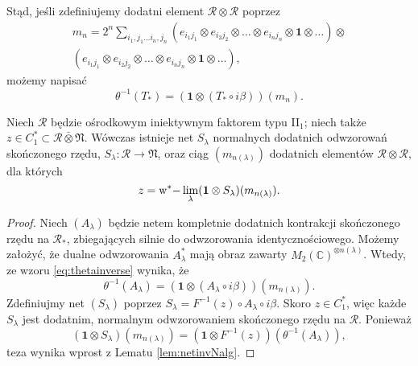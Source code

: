 Stąd, jeśli zdefiniujemy dodatni element $\mathcal{R}\otimes\mathcal{R}$ poprzez
\begin{eqnarray}
m_{n} = 2^{n} \sum \limits_{i_{1}, j_{1}\ldots i_{n}, j_{n}}
\left( e_{i_{1} j_{1}} \otimes e_{i_{2} j_{2}} \otimes \ldots \otimes
e_{i_{n} j_{n}} \otimes \mathbf{1} \otimes \ldots \right) \otimes \nonumber\\
\left( e_{i_{1} j_{1}} \otimes e_{i_{2} j_{2}}\otimes \ldots \otimes
e_{i_{n} j_{n}} \otimes \mathbf{1} \otimes \ldots\right),
\end{eqnarray}
możemy napisać
\begin{equation}
\label{eq:thetainverse}
\theta^{-1}(T_{*}) =(\mathbf{1} \otimes (T_{*} \circ i \beta)) (m_{n}).
\end{equation}

\begin{Lemma}
\label{lem:netininjectivefactor}
Niech $\mathcal{R}$
będzie ośrodkowym iniektywnym faktorem typu II$\phantom{}_{1}$;
niech także $z \in C_{1}^{*} \subset \mathcal{R} \bar{\otimes} \mathfrak{N}$.
Wówczas istnieje net $S_{\lambda}$ normalnych dodatnich odwzorowań skończonego rzędu,
$S_{\lambda}: \mathcal{R} \rightarrow \mathfrak{N}$,
oraz ciąg $(m_{n(\lambda)})$ dodatnich elementów $\mathcal{R} \otimes \mathcal{R}$,
dla których
\begin{equation}
z = {\rm w^*-} \lim \limits_{\lambda}(\mathbf{1} \otimes S_{\lambda})(m_{n(\lambda)}).
\end{equation}
\end{Lemma}
\begin{proof}
Niech $(A_{\lambda})$ będzie netem kompletnie dodatnich kontrakcji
skończonego rzędu na $\mathcal{R}_{*}$,
zbiegających silnie do odwzorowania identycznościowego.
Możemy założyć, że dualne odwzorowania $A_{\lambda}^{*}$
mają obraz zawarty $M_{2}(\mathbb{C})^{\otimes n(\lambda)}$.
Wtedy, ze wzoru \eqref{eq:thetainverse} wynika, że
\begin{equation}
\theta^{-1} (A_{\lambda}) =
( \mathbf{1} \otimes (A_{\lambda} \circ i\beta)) (m_{n(\lambda)}).
\end{equation}
Zdefiniujmy net $(S_{\lambda})$ poprzez
$S_{\lambda} = F^{-1}(z) \circ A_{\lambda} \circ i\beta$.
Skoro $z \in C_{1}^{*}$,
więc każde $S_{\lambda}$ jest dodatnim, normalnym odwzorowaniem skończonego rzędu
na $\mathcal{R}$.
Ponieważ
\begin{equation}
(\mathbf{1} \otimes S_{\lambda}) (m_{n(\lambda)}) =
(\mathbf{1} \otimes F^{-1}(z)) (\theta^{-1}(A_{\lambda})),
\end{equation}
teza wynika wprost z Lematu \ref{lem:netinvNalg}.
\end{proof}
